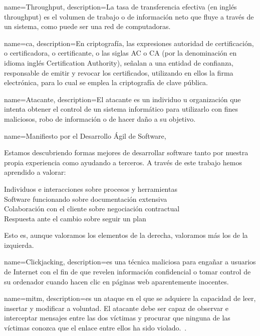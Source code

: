 {
    name=Throughput,
    description={La tasa de transferencia efectiva (en inglés throughput) es el volumen de trabajo o de información neto que fluye a través de
    un sistema, como puede ser una red de computadoras.}~\cite[Wikipedia]{wiki:throughput}
}

{
    name=\acrlong{ca},
    description={En criptografía, las expresiones autoridad de certificación, o certificadora, o certificante, o las siglas AC o CA (por la
    denominación en idioma inglés Certification Authority), señalan a una entidad de confianza, responsable de emitir y revocar los certificados,
    utilizando en ellos la firma electrónica, para lo cual se emplea la criptografía de clave pública.~\cite[Wikipedia]{wiki:ca}}
}

{
    name=Atacante,
    description={El atacante es un individuo u organización que intenta obtener el control de un sistema informático para utilizarlo con fines
    maliciosos, robo de información o de hacer daño a su objetivo.~\cite[Wikipedia]{wiki:atacante}}
}

{
    name={Manifiesto por el Desarrollo Ágil de Software},
  }
{
    \par Estamos descubriendo formas mejores de desarrollar software tanto por nuestra propia experiencia como ayudando a terceros. A través de este trabajo hemos aprendido a valorar:
    \par {\Large Individuos e interacciones} sobre procesos y herramientas\\
    {\Large Software funcionando} sobre documentación extensiva\\
    {\Large Colaboración con el cliente} sobre negociación contractual\\
    {\Large Respuesta ante el cambio} sobre seguir un plan
    \par Esto es, aunque valoramos los elementos de la derecha, valoramos más los de la izquierda.~\cite{ManifiestoAgil}
}


{
    name=Clickjacking,
    description={es una técnica maliciosa para engañar a usuarios de Internet con el fin de que revelen información confidencial o tomar control de su ordenador cuando hacen clic en
    páginas web aparentemente inocentes.~\cite[Wikipedia]{wiki:Clickjacking}}
}

{
  name=\acrlong{mitm},
    description={es un ataque en el que se adquiere la capacidad de leer, insertar y modificar a voluntad. El atacante debe ser capaz de observar e interceptar mensajes entre las dos víctimas y procurar que ninguna de las
    víctimas conozca que el enlace entre ellos ha sido violado.~\cite[Wikipedia]{wiki:mitm}}.
}


